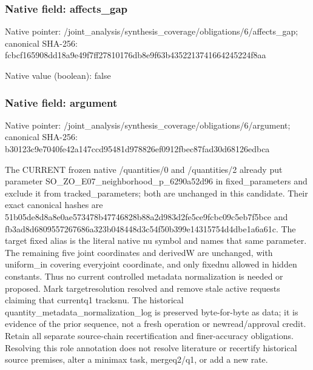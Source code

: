 \documentclass[10pt,a4paper]{article}
\begin{document}
\subsubsection{Native field: affects\_\allowbreak{}gap}
Native pointer: /joint\_\allowbreak{}analysis/synthesis\_\allowbreak{}coverage/obligations/6/affects\_\allowbreak{}gap; canonical SHA-256: fcbcf165908dd18a9e49f7ff27810176db8e9f63b4352213741664245224f8aa

Native value (boolean): false

\subsubsection{Native field: argument}
Native pointer: /joint\_\allowbreak{}analysis/synthesis\_\allowbreak{}coverage/obligations/6/argument; canonical SHA-256: b30123c9e7040fe42a147ccd95481d978826ef0912fbec87fad30d68126edbca

\begingroup\raggedright\sloppy The CURRENT frozen native /\allowbreak{}quantities/\allowbreak{}0 and /\allowbreak{}quantities/\allowbreak{}2 already put parameter SO\_\allowbreak{}ZO\_\allowbreak{}E07\_\allowbreak{}neighborhood\_\allowbreak{}p\_\allowbreak{}6290a52d96 in fixed\_\allowbreak{}parameters and exclude it from tracked\_\allowbreak{}parameters;\allowbreak{} both are unchanged in this candidate. Their exact canonical hashes are 51b05de8d8a8e0ae573478b47746828b88a2d983d2fe5ce9fcbc09c5eb7f5bce and fb3ad8d6809557267686a323b048448d3c54f50b399e14315754d4dbe1a6a61c. The target fixed alias is the literal native nu symbol and names that same parameter. The remaining five joint coordinates and derivedW are unchanged,\allowbreak{} with uniform\_\allowbreak{}in covering everyjoint coordinate,\allowbreak{} and only fixednu allowed in hidden constants. Thus no current controlled metadata normalization is needed or proposed. Mark targetresolution resolved and remove stale active requests claiming that currentq1 tracksnu. The historical quantity\_\allowbreak{}metadata\_\allowbreak{}normalization\_\allowbreak{}log is preserved byte-for-byte as data;\allowbreak{} it is evidence of the prior sequence,\allowbreak{} not a fresh operation or newread/\allowbreak{}approval credit. Retain all separate source-chain recertification and finer-accuracy obligations. Resolving this role annotation does not resolve literature or recertify historical source premises,\allowbreak{} alter a minimax task,\allowbreak{} mergeq2/\allowbreak{}q1,\allowbreak{} or add a new rate.\par\endgroup
\end{document}
